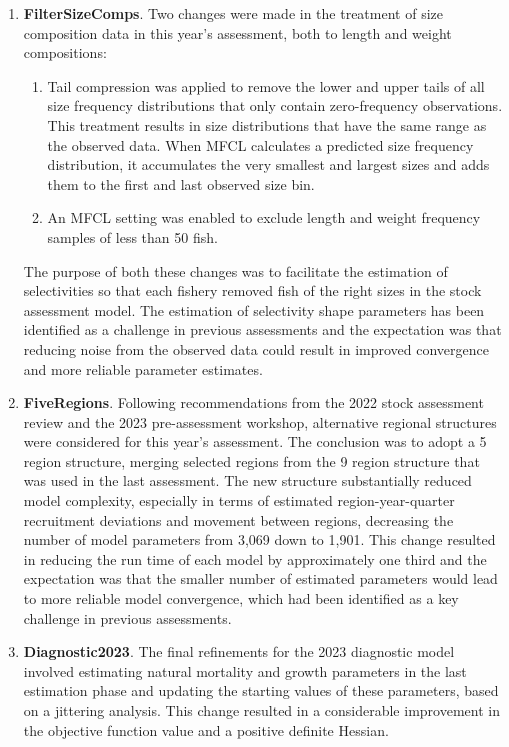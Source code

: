 \begin{enumerate}
  \item \textbf{FilterSizeComps}. Two changes were made in the treatment of size composition data in this year's assessment, both to length and weight compositions:
  \begin{enumerate}
    \item Tail compression was applied to remove the lower and upper tails of all size frequency distributions that only contain zero-frequency observations. This treatment results in size distributions that have the same range as the observed data. When MFCL calculates a predicted size frequency distribution, it accumulates the very smallest and largest sizes and adds them to the first and last observed size bin.
    \item An MFCL setting was enabled to exclude length and weight frequency samples of less than 50 fish.
  \end{enumerate}
  The purpose of both these changes was to facilitate the estimation of selectivities so that each fishery removed fish of the right sizes in the stock assessment model. The estimation of selectivity shape parameters has been identified as a challenge in previous assessments and the expectation was that reducing noise from the observed data could result in improved convergence and more reliable parameter estimates.

  \item \textbf{FiveRegions}. Following recommendations from the 2022 stock assessment review and the 2023 pre-assessment workshop, alternative regional structures were considered for this year's assessment. The conclusion was to adopt a 5 region structure, merging selected regions from the 9 region structure that was used in the last assessment. The new structure substantially reduced model complexity, especially in terms of estimated region-year-quarter recruitment deviations and movement between regions, decreasing the number of model parameters from 3,069 down to 1,901. This change resulted in reducing the run time of each model by approximately one third and the expectation was that the smaller number of estimated parameters would lead to more reliable model convergence, which had been identified as a key challenge in previous assessments.

  \item \textbf{Diagnostic2023}. The final refinements for the 2023 diagnostic model involved estimating natural mortality and growth parameters in the last estimation phase and updating the starting values of these parameters, based on a jittering analysis. This change resulted in a considerable improvement in the objective function value and a positive definite Hessian.

\end{enumerate}

